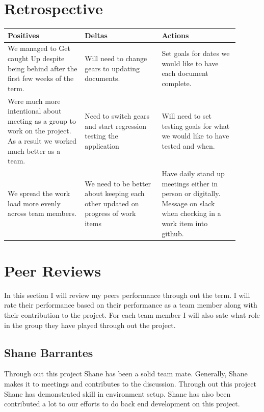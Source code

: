 \documentclass[onecolumn, draftclsnofoot,10pt, compsoc]{article}
\begin{document}
\section{Retrospective}
	\begin{center}
		\begin{tabular}{| p{0.3\linewidth} | p{0.3\linewidth} | p{0.3\linewidth} |}
		\hline
		Positives & Deltas & Actions \\ 
		\hline
			We managed to Get caught Up despite being behind after the first few weeks of the term.
			& Will need to change gears to updating documents.
			& Set goals for dates we would like to have each document complete.  \\ 
		\hline
			Were much more intentional about meeting as a group to work on the project. As a result we worked much better as a team. 
			& Need to switch gears and start regression testing the application 
			& Will need to set testing goals for what we would like to have tested and when. \\ 		\hline
			We spread the work load more evenly across team members. &
			We need to be better about keeping each other updated on progress of work items &
			Have daily stand up meetings either in person or digitally. Message on slack when checking in a work item into github.\\
			\hline
				
		
		
	
	\end{tabular}
\end{center}
	
	
\section{Peer Reviews}
	In this section I will review my peers performance through out the term. I will rate their performance based on their performance as a team member along with their contribution to the project. For each team member I will also sate what role in the group they have played through out the project.\\
	
	\subsection{Shane Barrantes}
	Through out this project Shane has been a solid team mate. Generally, Shane makes it to meetings and contributes to the discussion. Through out this project Shane has demonstrated skill in environment setup. Shane has also been contributed a lot to our efforts to do back end development on this project.\\
	
\end{document}
